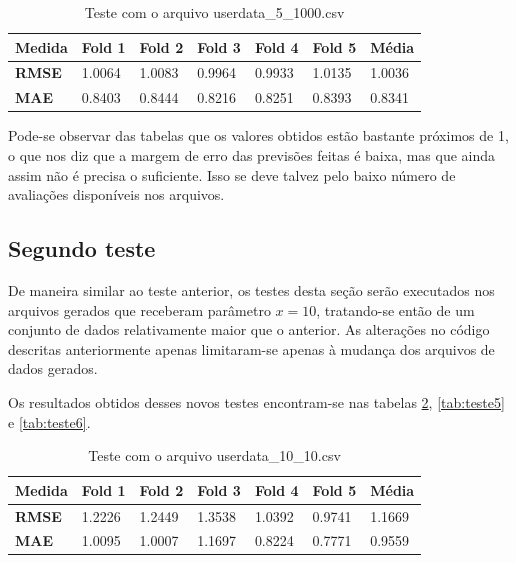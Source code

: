 \documentclass[
	12pt,				%
	oneside,			%
	a4paper,			%
	chapter=TITLE,		%
	english,			%
	french,				%
	spanish,			%
	brazil				%
	]{abntex2}
\begin{document}
\begin{table}[ht]
    \centering
    \ABNTEXchapterfont
    \caption{Teste com o arquivo userdata\_5\_1000.csv}
    \begin{tabular}{|m{1.5cm}|m{1.5cm}|m{1.5cm}|m{1.5cm}|m{1.5cm}|m{1.5cm}|m{1.5cm}|}
    \hline
        \textbf{Medida}& \textbf{Fold 1} & \textbf{Fold 2} & \textbf{Fold 3} & \textbf{Fold 4}& \textbf{Fold 5} & \textbf{Média}\\
        \hline
        \hline
        \textbf{RMSE} & 1.0064 & 1.0083 & 0.9964 & 0.9933 & 1.0135 & 1.0036 \\ 
        \hline
        \textbf{MAE} & 0.8403 & 0.8444 & 0.8216 & 0.8251 & 0.8393 & 0.8341 \\
        \hline
    \end{tabular}
    \label{tab:teste3}
\end{table}

Pode-se observar das tabelas que os valores obtidos estão bastante próximos de 1, o que nos diz que a margem de erro das previsões feitas é baixa, mas que ainda assim não é precisa o suficiente. Isso se deve talvez pelo baixo número de avaliações disponíveis nos arquivos.

\subsection{Segundo teste}

De maneira similar ao teste anterior, os testes desta seção serão executados nos arquivos gerados que receberam parâmetro $x=10$, tratando-se então de um conjunto de dados relativamente maior que o anterior. As alterações no código descritas anteriormente apenas limitaram-se apenas à mudança dos arquivos de dados gerados.

Os resultados obtidos desses novos testes encontram-se nas tabelas \ref{tab:teste4}, \ref{tab:teste5} e \ref{tab:teste6}.

\begin{table}[ht]
    \centering
    \ABNTEXchapterfont
    \caption{Teste com o arquivo userdata\_10\_10.csv}
    \begin{tabular}{|m{1.5cm}|m{1.5cm}|m{1.5cm}|m{1.5cm}|m{1.5cm}|m{1.5cm}|m{1.5cm}|}
    \hline
        \textbf{Medida}& \textbf{Fold 1} & \textbf{Fold 2} & \textbf{Fold 3} & \textbf{Fold 4}& \textbf{Fold 5} & \textbf{Média}\\
        \hline
        \hline
        \textbf{RMSE} & 1.2226 & 1.2449 & 1.3538 & 1.0392 & 0.9741 & 1.1669   \\ 
        \hline
        \textbf{MAE} & 1.0095 & 1.0007 & 1.1697 & 0.8224 & 0.7771 & 0.9559 \\
        \hline
    \end{tabular}
    \label{tab:teste4}
\end{table}
\end{document}
